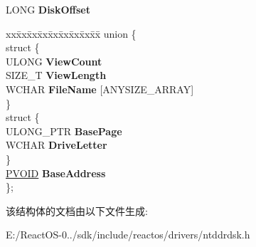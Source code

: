 \begin{DoxyCompactItemize}
L\+O\+NG {\bfseries Disk\+Offset}
\item 
\mbox{\label{struct___r_a_m_d_i_s_k___c_r_e_a_t_e___i_n_p_u_t_ac1a8894548f5f0d97f741034af75a1f7}} 
\begin{tabbing}
xx\=xx\=xx\=xx\=xx\=xx\=xx\=xx\=xx\=\kill
union \{\\
\mbox{\label{union___r_a_m_d_i_s_k___c_r_e_a_t_e___i_n_p_u_t_1_1_0D2927_a07c23f9e1d531006c78910bee12b5241}} 
\>struct \{\\
\>\>ULONG {\bfseries ViewCount}\\
\>\>SIZE\_T {\bfseries ViewLength}\\
\>\>WCHAR {\bfseries FileName} \mbox{[}ANYSIZE\_ARRAY\mbox{]}\\
\>\} \\
\mbox{\label{union___r_a_m_d_i_s_k___c_r_e_a_t_e___i_n_p_u_t_1_1_0D2927_a105781688d77d6c4becbe80ef3e20df0}} 
\>struct \{\\
\>\>ULONG\_PTR {\bfseries BasePage}\\
\>\>WCHAR {\bfseries DriveLetter}\\
\>\} \\
\>\hyperlink{interfacevoid}{PVOID} {\bfseries BaseAddress}\\
\}; \\

\end{tabbing}\end{DoxyCompactItemize}


该结构体的文档由以下文件生成\+:\begin{DoxyCompactItemize}
\item 
E\+:/\+React\+O\+S-\/0../sdk/include/reactos/drivers/ntddrdsk.\+h\end{DoxyCompactItemize}

